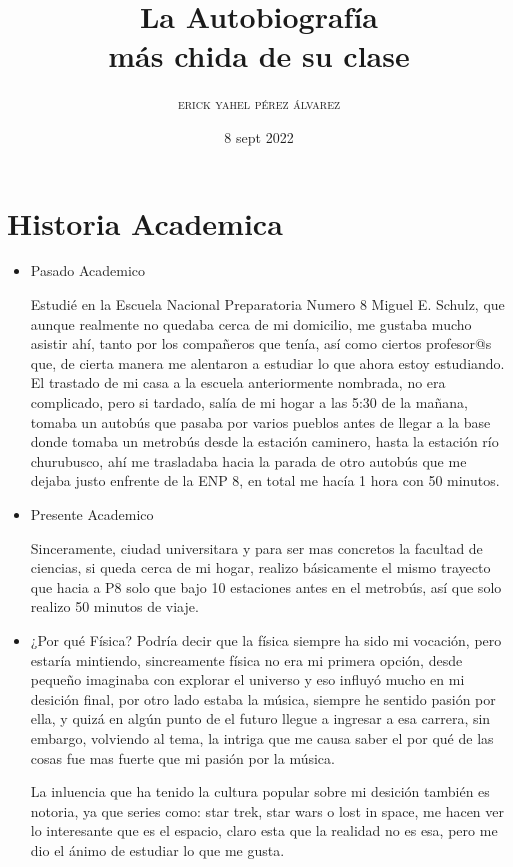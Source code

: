\documentclass[12pt]{article}
\title{La Autobiografía\\más chida de su clase}
\author{\textsc{erick yahel pérez álvarez}}
\date{8 sept 2022}
\begin{document}
\maketitle

\section{Historia Academica}
\begin{itemize}
    \item {Pasado Academico}
    
    Estudié en la Escuela Nacional Preparatoria Numero 8 Miguel E. Schulz, que aunque realmente no quedaba cerca de mi domicilio, me gustaba mucho asistir ahí, tanto por los compañeros que tenía, así como ciertos profesor@s que, de cierta manera me alentaron a estudiar lo que ahora estoy estudiando. El trastado de mi casa a la escuela anteriormente nombrada, no era complicado, pero si tardado, salía de mi hogar a las 5:30 de la mañana, tomaba un autobús que pasaba por varios pueblos antes de llegar a la base donde tomaba un metrobús desde la estación caminero, hasta la estación río churubusco, ahí me trasladaba hacia la parada de otro autobús que me dejaba justo enfrente de la ENP 8, en total me hacía 1 hora con 50 minutos.
    
   \item Presente Academico
   
   Sinceramente, ciudad universitara y para ser mas concretos la facultad de ciencias, si queda cerca de mi hogar, realizo básicamente el mismo trayecto que hacia a P8 solo que bajo 10 estaciones antes en el metrobús, así que solo realizo 50 minutos de viaje.

   \item {¿Por qué Física?}
   Podría decir que la física siempre ha sido mi vocación, pero estaría mintiendo, sincreamente física no era mi primera opción, desde pequeño imaginaba con explorar el universo y eso influyó mucho en mi desición final, por otro lado estaba la música, siempre he sentido pasión por ella, y quizá en algún punto de el futuro llegue a ingresar a esa carrera, sin embargo, volviendo al tema, la intriga que me causa saber el por qué de las cosas fue mas fuerte que mi pasión por la música.
   
   La inluencia que ha tenido la cultura popular sobre mi desición también es notoria, ya que series como: star trek, star wars o lost in space, me hacen ver lo interesante que es el espacio, claro esta que la realidad no es esa, pero me dio el ánimo de estudiar lo que me gusta.
   

\end{itemize}
\end{document}
